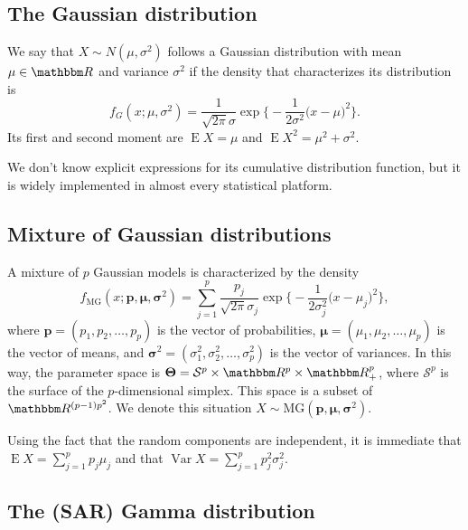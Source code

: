 \subsection{The Gaussian distribution}

We say that $X\sim N(\mu,\sigma^2)$ follows a Gaussian distribution with mean $\mu\in\mathbbm R$ and variance $\sigma^2$ if the density that characterizes its distribution is
\begin{equation}
f_G(x;\mu,\sigma^2) = \frac{1}{\sqrt{2\pi}\sigma} \exp\Big\{
-\frac{1}{2\sigma^2} \big(x - \mu)^2
\Big\}.
\end{equation}
Its first and second moment are $\operatorname{E}X=\mu$ and
$\operatorname{E}X^2=\mu^2+\sigma^2$.

We don't know explicit expressions for its cumulative distribution function, but it is widely implemented in almost every statistical platform.

\subsection{Mixture of Gaussian distributions}

A mixture of $p$ Gaussian models is characterized by the density
\begin{equation}
f_{\text{MG}}(x;\bm p,\bm \mu, \bm \sigma^2) = 
\sum_{j=1}^{p}
\frac{p_j}{\sqrt{2\pi}\sigma_j} \exp\Big\{
-\frac{1}{2\sigma_j^2} \big(x - \mu_j)^2 \Big\},
\label{eq:DensMixtureGaussian}
\end{equation}
where $\bm p=(p_1,p_2, \dots, p_p)$ is the vector of probabilities,
$\bm \mu = (\mu_1, \mu_2,\dots, \mu_p)$ is the vector of means,
and
$\bm \sigma^2 = (\sigma^2_1, \sigma^2_2,\dots, \sigma^2_ p)$ is the vector of variances.
In this way, the parameter space is $\bm \Theta =
\mathcal S^p\times \mathbbm R^p \times \mathbbm R_+^p$, where
$\mathcal S^p$ is the surface of the $p$-dimensional simplex.
This space is a subset of $\mathbbm R^{(p-1)p^2}$. 
We denote this situation $X\sim \text{MG}(\bm p, \bm \mu, \bm \sigma^2)$.

Using the fact that the random components are independent, it is immediate that
$\operatorname{E}X = \sum_{j=1}^{p} p_j\mu_j$ and that
$\operatorname{Var}X = \sum_{j=1}^{p} p_j^2\sigma^2_j$.

\subsection{The (SAR) Gamma distribution}


